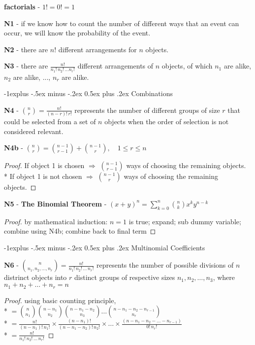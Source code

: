 \documentclass[10pt, landscape]{article}
\makeatletter
\renewcommand{\subsection}{\@startsection{subsection}{2}{0mm}%
  {-1explus -.5ex minus -.2ex}%
  {0.5ex plus .2ex}%
{\normalfont\normalsize\bfseries}}
\makeatother
\begin{document}
\begin{multicols*}{3}
  \textbf{factorials} - $1! = 0! = 1$

  \textbf{N1} - if we know how to count the number of different ways that an event can occur, we will know the probability of the event.

  \textbf{N2} - there are $n!$ different arrangements for $n$ objects.

  \textbf{N3} - there are $\frac{n!}{n_1!\, n_2!\, \dots n_r!}$ different arrangements of $n$ objects, 
  of which $n_1$ are alike, $n_2$ are alike, ..., $n_r$ are alike.

  \subsection{Combinations}

  \textbf{N4} - $\binom{n}{r} = \frac{n!}{(n-r)!\,r!}$ represents the number of different groups of size $r$ that could be selected from a set of $n$ objects when the order of selection is not considered relevant.

  \textbf{N4b} - $\binom{n}{r} = \binom{n-1}{r-1} + \binom{n-1}{r}, \quad 1 \leq r \leq n$
  \begin{proof}
    If object 1 is chosen $\Rightarrow$ $\binom{n-1}{r-1}$ ways of choosing the remaining objects.
    \\* If object 1 is not chosen $\Rightarrow$ $\binom{n-1}{r}$ ways of choosing the remaining objects.
  \end{proof}

  \textbf{N5} - \textbf{The Binomial Theorem} - \( {\displaystyle{(x+y)^n = \sum^n_{k=0} \binom{n}{k} x^k y^{n-k} }} \) 
  \begin{proof}
    by mathematical induction: $n=1$ is true; expand; sub dummy variable; combine using N4b; combine back to final term
  \end{proof}

  \subsection{Multinomial Coefficients}

  \textbf{N6} - $\binom{n}{n_1, n_2, \dots, n_r} = \frac{n!}{n_1!\, n_2!\, \dots \, n_r!}$  
  represents the number of possible divisions of $n$ distrinct objects 
  into $r$ distinct groups of respective sizes $n_1, n_2, \dots, n_3$, 
  where $n_1 + n_2 + \dots + n_r = n$
  \begin{proof}
    using basic counting principle, 
    \\* $= \binom{n}{n_1} \binom{n-n_1}{n_2} \binom{n-n_1-n_2}{n_3} \dots \binom{n-n_1-n_2-n_{r-1}}{n_r}$
    \\* $= \frac{n!}{(n-n_1)!\,n_1!} \times \frac{(n-n_1)!}{(n-n_1-n_2)!\, n_2!} \times \dots \times \frac{( n-n_1-n_2-\dots -n_{r-1} )}{0!\, n_r!}$
    \\* $= \frac{n!}{n_1!\, n_2! \, \dots \, n_r!}$
  \end{proof}


\end{multicols*}
\end{document}
